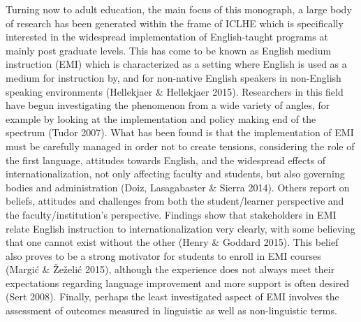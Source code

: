 \begin{styleStandard}
Turning now to adult education, the main focus of this monograph, a large body of research has been generated within the frame of ICLHE which is specifically interested in the widespread implementation of English-taught programs at mainly post graduate levels. This has come to be known as English medium instruction (EMI) which is characterized as a setting where English is used as a medium for instruction by, and for non-native English speakers in non-English speaking environments (Hellekjaer \& Hellekjaer 2015). Researchers in this field have begun investigating the phenomenon from a wide variety of angles, for example by looking at the implementation and policy making end of the spectrum (Tudor 2007). What has been found is that the implementation of EMI must be carefully managed in order not to create tensions, considering the role of the first language, attitudes towards English, and the widespread effects of internationalization, not only affecting faculty and students, but also governing bodies and administration (Doiz, Lasagabaster \& Sierra 2014). Others report on beliefs, attitudes and challenges from both the student/learner perspective and the faculty/institution’s perspective. Findings show that stakeholders in EMI relate English instruction to internationalization very clearly, with some believing that one cannot exist without the other (Henry \& Goddard 2015). This belief also proves to be a strong motivator for students to enroll in EMI courses (Margić \& Žeželić 2015), although the experience does not always meet their expectations regarding language improvement and more support is often desired (Sert 2008). Finally, perhaps the least investigated aspect of EMI involves the assessment of outcomes measured in linguistic as well as non-linguistic terms. 
\end{styleStandard}

